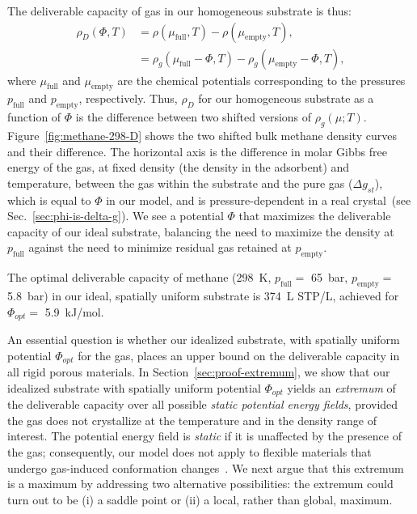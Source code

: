 \documentclass[twoside,twocolumn,9pt]{article}
\newcommand\V{\Phi}
\newcommand\pfull{\ensuremath{p_{\text{full}}}}
\newcommand\pempty{\ensuremath{p_{\text{empty}}}}
\newcommand\mufull{\ensuremath{\mu_{\text{full}}}}
\newcommand\muempty{\ensuremath{\mu_{\text{empty}}}}
\newcommand\gst{\ensuremath{\Delta g_{st}}}
\begin{document}
The deliverable capacity of gas in our homogeneous substrate is thus:
\begin{align}
    \rho_D(\V,T) &= \rho(\mufull,T) - \rho(\muempty,T),
    \label{eq:DofPhi}
    \\
    &= \rho_g(\mufull-\V,T) - \rho_g(\muempty-\V,T),
\end{align}
where $\mufull$ and $\muempty$ are the chemical potentials corresponding to the
pressures $\pfull$ and $\pempty$, respectively. Thus, $\rho_D$ for our
homogeneous substrate as a function of $\V$ is the difference between two
shifted versions of $\rho_g(\mu; T)$. Figure~\ref{fig:methane-298-D} shows the
two shifted bulk methane density curves and their difference. The horizontal
axis is the difference in molar Gibbs free energy of the gas, at fixed density (the density in the adsorbent) and temperature, between the gas within the substrate and the pure gas (\gst),
which is equal to $\V$ in our model, and is pressure-dependent in a real
crystal~(see Sec.~\ref{sec:phi-is-delta-g}). We see a potential $\V$ that
maximizes the deliverable capacity of our ideal substrate, balancing the need
to maximize the density at $\pfull$ against the need to minimize residual gas
retained at $\pempty$.

The optimal deliverable capacity of methane (298\ K, $\pfull=$ 65\ bar,
$\pempty=$ 5.8\ bar) in our ideal, spatially uniform substrate is 374\ L STP/L,
achieved for $\V_{opt} =$ 5.9\ kJ/mol.

An essential question is whether our idealized substrate, with spatially
uniform potential $\V_{opt}$ for the gas, places an upper bound on the
deliverable capacity in all rigid porous materials. In
Section~\ref{sec:proof-extremum}, we show that our idealized substrate with
spatially uniform potential $\V_{opt}$ yields an \emph{extremum} of the
deliverable capacity over all possible \emph{static potential energy fields},
provided the gas does not crystallize at the temperature and in the density
range of interest. The potential energy field is \emph{static} if it is
unaffected by the presence of the gas; consequently, our model does not apply
to flexible materials that undergo gas-induced conformation
changes~\cite{schneemann2014flexible}. We next argue that this extremum is a
maximum by addressing two alternative possibilities: the extremum could turn
out to be (i) a saddle point or (ii) a local, rather than global, maximum.
\end{document}
